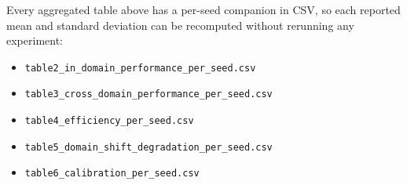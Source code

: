 \documentclass[runningheads]{llncs}
\begin{document}
Every aggregated table above has a per-seed companion in CSV, so each reported
mean and standard deviation can be recomputed without rerunning any experiment:

\begin{itemize}
\item \texttt{table2\_in\_domain\_performance\_per\_seed.csv}
\item \texttt{table3\_cross\_domain\_performance\_per\_seed.csv}
\item \texttt{table4\_efficiency\_per\_seed.csv}
\item \texttt{table5\_domain\_shift\_degradation\_per\_seed.csv}
\item \texttt{table6\_calibration\_per\_seed.csv}
\end{itemize}
\end{document}
